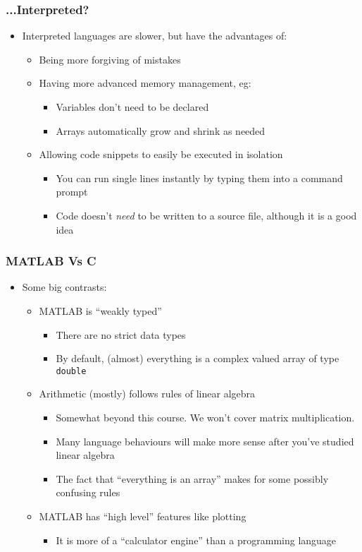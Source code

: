 \documentclass[14pt]{beamer}
\begin{document}
\begin{frame}
\frametitle{...Interpreted?}
\begin{itemize}
\item Interpreted languages are slower, but have the advantages of:
	\begin{itemize}
		\item Being more forgiving of mistakes
		\item Having more advanced memory management, eg:
			\begin{itemize}
				\item Variables don't need to be declared
				\item Arrays automatically grow and shrink as needed
			\end{itemize}
		\item Allowing code snippets to easily be executed in isolation
			\begin{itemize}
				\item You can run single lines instantly by typing them into a command prompt
				\item Code doesn't \textit{need} to be written to a source file, although it is a good idea
			\end{itemize}
	\end{itemize}
\end{itemize}
\end{frame}

\begin{frame}
\frametitle{MATLAB Vs C}
\begin{itemize}
\item Some big contrasts:
	\begin{itemize}
		\item MATLAB is ``weakly typed''
			\begin{itemize}
				\item There are no strict data types
				\item By default, (almost) everything is a complex valued array of type \texttt{double}
			\end{itemize}
		\item Arithmetic (mostly) follows rules of linear algebra
			\begin{itemize}
				\item Somewhat beyond this course. We won't cover matrix multiplication.
				\item Many language behaviours will make more sense after you've studied linear algebra
				\item The fact that ``everything is an array'' makes for some possibly confusing rules
			\end{itemize}
		\item MATLAB has ``high level'' features like plotting
			\begin{itemize}
				\item It is more of a ``calculator engine'' than a programming language
			\end{itemize}
	\end{itemize}
\end{itemize}
\end{frame}
\end{document}
